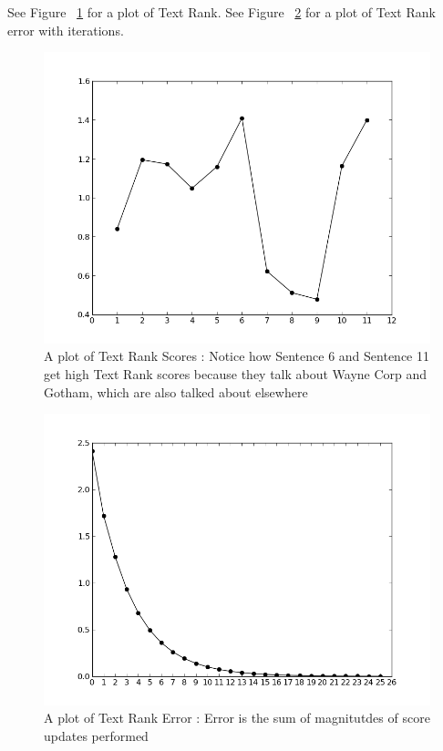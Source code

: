 \documentclass[paper=a4, fontsize=11pt]{scrartcl} %
\numberwithin{equation}{section} %
\numberwithin{figure}{section} %
\numberwithin{table}{section} %
\begin{document}
See Figure ~\ref{fig:tr} for a plot of Text Rank. See Figure ~\ref{fig:error} for a plot of Text Rank error with iterations. 

\begin{figure}[h!]
  \centering
    \includegraphics[width=.75\textwidth]{images/tr}
    \caption{A plot of Text Rank Scores : Notice how Sentence 6 and Sentence 11 get high Text Rank scores because they talk about Wayne Corp and Gotham, which are also talked about elsewhere}
    \label{fig:tr}
\end{figure}


\begin{figure}[h!]
  \centering
    \includegraphics[width=.8\textwidth]{images/error}
    \caption{A plot of Text Rank Error : Error is the sum of magnitutdes of score updates performed}
    \label{fig:error}
\end{figure}

\pagebreak
\end{document}
